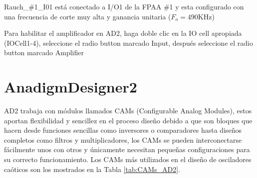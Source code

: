 	Rauch\_\#1\_I01 está conectado a I/O1 de la FPAA \#1 y esta configurado con una frecuencia de corte muy alta y ganancia unitaria ($F_{o} = 490$KHz)
	
	Para habilitar el amplificador en AD2, haga doble clic en la IO cell apropiada (IOCell1-4), seleccione el radio button marcado Input, después seleccione el radio button marcado Amplifier
	\section{AnadigmDesigner2}
	
	AD2 trabaja con módulos llamados CAMs (Configurable Analog Modules), estos aportan flexibilidad y sencillez en el proceso diseño debido a que son bloques que hacen desde funciones sencillas como inversores o comparadores hasta diseños completos como filtros y multiplicadores, los CAMs se pueden interconectarse fácilmente unos con otros y únicamente necesitan pequeñas configuraciones para su correcto funcionamiento. Los CAMs más utilizados en el diseño de osciladores caóticos son los mostrados en la Tabla \ref{tab:CAMs_AD2}.
	

